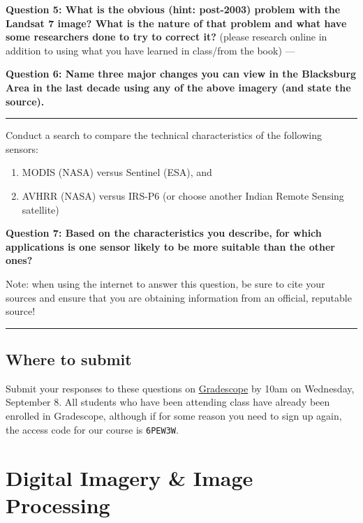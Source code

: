 \documentclass[
]{article}
\providecommand{\tightlist}{%
  \setlength{\itemsep}{0pt}\setlength{\parskip}{0pt}}
\begin{document}
\textbf{Question 5: What is the obvious (hint: post-2003) problem with the Landsat 7 image? What is the nature of that problem and what have some researchers done to try to correct it?} (please research online in addition to using what you have learned in class/from the book)
---

\textbf{Question 6: Name three major changes you can view in the Blacksburg Area in the last decade using any of the above imagery (and state the source).}

\begin{center}\rule{0.5\linewidth}{0.5pt}\end{center}

Conduct a search to compare the technical characteristics of the following sensors:

\begin{enumerate}
\def\labelenumi{(\roman{enumi})}
\tightlist
\item
  MODIS (NASA) versus Sentinel (ESA), and
\item
  AVHRR (NASA) versus IRS-P6 (or choose another Indian Remote Sensing satellite)
\end{enumerate}

\textbf{Question 7: Based on the characteristics you describe, for which applications is one sensor likely to be more suitable than the other ones? }

Note: when using the internet to answer this question, be sure to cite your sources and ensure that you are obtaining information from an official, reputable source!

\begin{center}\rule{0.5\linewidth}{0.5pt}\end{center}

\hypertarget{where-to-submit}{%
\subsection*{Where to submit}\label{where-to-submit}}

Submit your responses to these questions on \href{https://www.gradescope.com/courses/293173/assignments/1446622/submissions}{Gradescope} by 10am on Wednesday, September 8. All students who have been attending class have already been enrolled in Gradescope, although if for some reason you need to sign up again, the access code for our course is \texttt{6PEW3W}.

\hypertarget{lab2}{%
\section{Digital Imagery \& Image Processing}\label{lab2}}
\end{document}
